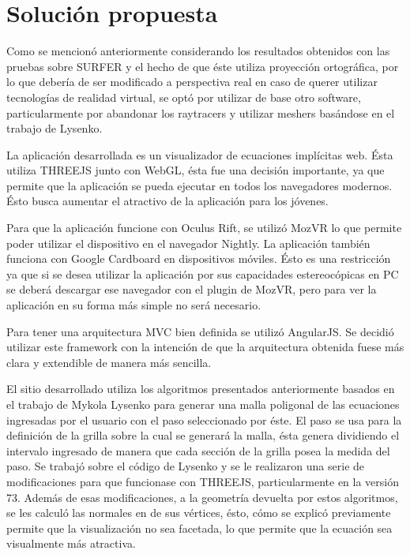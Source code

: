 \documentclass[12pt]{article}
\begin{document}
\section{Solución propuesta}
Como se mencionó anteriormente considerando los resultados obtenidos con las pruebas sobre SURFER  y el hecho de que éste utiliza proyección ortográfica, por lo que debería de ser modificado a perspectiva real en caso de querer utilizar tecnologías de realidad virtual, se optó por utilizar de base otro software, particularmente por abandonar los raytracers y utilizar meshers basándose en el trabajo de Lysenko.

La aplicación desarrollada es un visualizador de ecuaciones implícitas web. Ésta utiliza THREEJS junto con WebGL, ésta fue una decisión importante, ya que permite que la aplicación se pueda ejecutar en todos los navegadores modernos. Ésto busca  aumentar el atractivo de la aplicación para los jóvenes.

Para que la aplicación funcione con Oculus Rift, se utilizó MozVR lo que permite poder utilizar el dispositivo en el navegador Nightly. La aplicación también funciona con Google Cardboard en dispositivos móviles. Ésto es una restricción ya que si se desea utilizar la aplicación por sus capacidades estereocópicas en PC se deberá descargar ese navegador con el plugin de MozVR, pero para ver la aplicación en su forma más simple no será necesario.

 Para tener una arquitectura MVC bien definida se utilizó AngularJS. Se decidió utilizar este framework con la intención de que la arquitectura obtenida fuese más clara y extendible de manera más sencilla.

El sitio desarrollado utiliza los algoritmos presentados anteriormente basados en el trabajo de Mykola Lysenko\cite{mykola1}\cite{mykola2} para generar una malla poligonal de las ecuaciones ingresadas por el usuario con el paso seleccionado por éste. El paso se usa para la definición de la grilla sobre la cual se generará la malla, ésta genera dividiendo el intervalo ingresado de manera que cada sección de la grilla posea la medida del paso. Se trabajó sobre el código de Lysenko y se le realizaron una serie de modificaciones para que funcionase con THREEJS, particularmente en la versión 73. Además de esas modificaciones, a la geometría devuelta por estos algoritmos, se les calculó las normales en de sus vértices, ésto, cómo se explicó previamente permite que la visualización no sea facetada, lo que permite que la ecuación sea visualmente más atractiva. 
\end{document}
